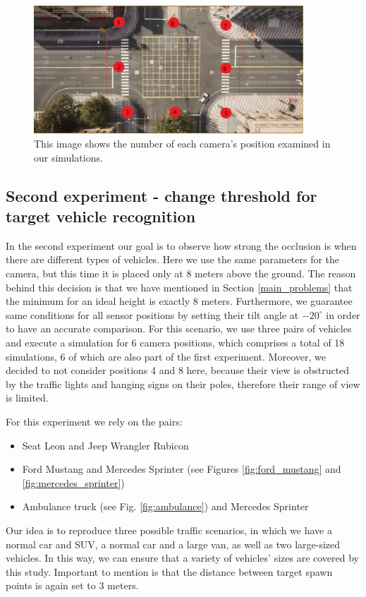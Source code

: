 \begin{figure} [h!]
    \centering
    \includegraphics[width=0.90\textwidth]{images/positions_numerated.png}
    \caption[Enumerated camera positions]{This image shows the number of each camera's position examined in our simulations.}
    \label{fig:positions_enumerated}
\end{figure}

\newpage
\subsection{Second experiment - change threshold for target vehicle recognition}
In the second experiment our goal is to observe how strong the occlusion is when there are different types of vehicles. Here we use the same parameters for the camera, but this time it is placed only at 8 meters above the ground. The reason behind this decision is that we have mentioned in Section \ref{main_problems} that the minimum for an ideal height is exactly 8 meters. Furthermore, we guarantee same conditions for all sensor positions by setting their tilt angle at $-20^{\circ}$ in order to have an accurate comparison. For this scenario, we use three pairs of vehicles and execute a simulation for 6 camera positions, which comprises a total of 18 simulations, 6 of which are also part of the first experiment. Moreover, we decided to not consider positions 4 and 8 here, because their view is obstructed by the traffic lights and hanging signs on their poles, therefore their range of view is limited.

For this experiment we rely on the pairs:
\begin{itemize}
    \item Seat Leon and Jeep Wrangler Rubicon
    \item Ford Mustang and Mercedes Sprinter (see Figures \ref{fig:ford_mustang} and \ref{fig:mercedes_sprinter})
    \item Ambulance truck (see Fig. \ref{fig:ambulance}) and Mercedes Sprinter
\end{itemize}
Our idea is to reproduce three possible traffic scenarios, in which we have a normal car and SUV, a normal car and a large van, as well as two large-sized vehicles. In this way, we can ensure that a variety of vehicles' sizes are covered by this study. Important to mention is that the distance between target spawn points is again set to 3 meters. 


